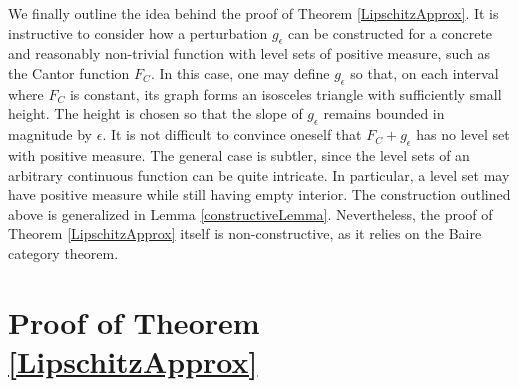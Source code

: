 \documentclass{amsart}
\numberwithin{equation}{section}
\begin{document}
We finally outline the idea behind the proof of Theorem \ref{LipschitzApprox}. It is instructive to consider how a perturbation $g_\epsilon$ can be constructed for a concrete and reasonably non-trivial function with level sets of positive measure, such as the Cantor function $F_C$. In this case, one may define $g_\epsilon$ so that, on each interval where $F_C$ is constant, its graph forms an isosceles triangle with sufficiently small height. The height is chosen so that the slope of $g_\epsilon$ remains bounded in magnitude by $\epsilon$.
It is not difficult to convince oneself that $F_C+g_\epsilon$ has no level set with positive measure. The general case is subtler, since the level sets of an arbitrary continuous function can be quite intricate. In particular, a level set may have positive measure while still having empty interior. The construction outlined above is generalized in Lemma \ref{constructiveLemma}.  Nevertheless, the proof of Theorem \ref{LipschitzApprox} itself is non-constructive, as it relies on the Baire category theorem.



\section{Proof of Theorem \ref{LipschitzApprox}}
\end{document}
